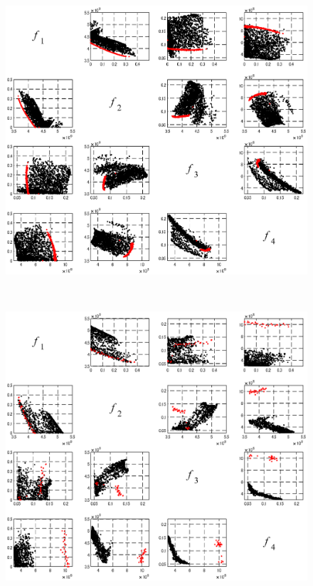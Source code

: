 \begin{figure}[htbp]
  \begin{center}
    \begin{minipage}{0.8\textwidth}
      \begin{center}
        \includegraphics[width=1\textwidth,keepaspectratio=true]{fig/surrogate_result_pareto_robust_matrix_surrogate.eps}\\\vspace{-5mm}{\small (a)サロゲート評価器を用いたロバスト最適化で得た解集合}
      \end{center}
    \end{minipage}
    \\
    \begin{minipage}{0.8\textwidth}
      \begin{center}
        \includegraphics[width=1\textwidth,keepaspectratio=true]{fig/surrogate_result_pareto_robust_matrix_sim.eps}\\\vspace{-5mm}{\small (b)シミュレーションを用いたロバスト最適化で得た解集合}

\end{center}
\end{minipage}
\end{center}
\end{figure}
